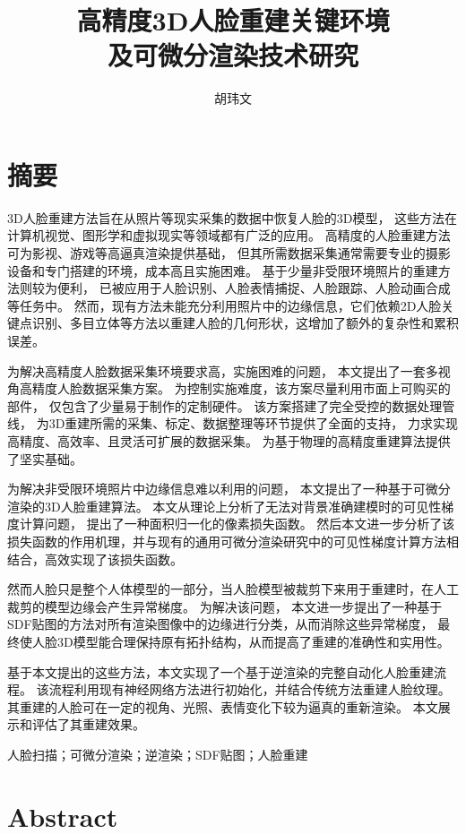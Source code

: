 \documentclass{scutmaster}
\title{高精度3D人脸重建关键环境\texorpdfstring{\\}{}及可微分渲染技术研究}
\date{\zhtoday}
\author{胡玮文}
\begin{document}
\maketitle
\hideinblind{
    \maketitleEN
    \nominationpage
    \declareoforiginality
}

\frontmatter
\chapter{摘\texorpdfstring{\quad}{}要}

3D人脸重建方法旨在从照片等现实采集的数据中恢复人脸的3D模型，
这些方法在计算机视觉、图形学和虚拟现实等领域都有广泛的应用。
高精度的人脸重建方法可为影视、游戏等高逼真渲染提供基础，
但其所需数据采集通常需要专业的摄影设备和专门搭建的环境，成本高且实施困难。
基于少量非受限环境照片的重建方法则较为便利，
已被应用于人脸识别、人脸表情捕捉、人脸跟踪、人脸动画合成等任务中。
然而，现有方法未能充分利用照片中的边缘信息，它们依赖2D人脸关键点识别、多目立体等方法以重建人脸的几何形状，这增加了额外的复杂性和累积误差。

为解决高精度人脸数据采集环境要求高，实施困难的问题，
本文提出了一套多视角高精度人脸数据采集方案。
为控制实施难度，该方案尽量利用市面上可购买的部件，
仅包含了少量易于制作的定制硬件。
该方案搭建了完全受控的数据处理管线，
为3D重建所需的采集、标定、数据整理等环节提供了全面的支持，
力求实现高精度、高效率、且灵活可扩展的数据采集。
为基于物理的高精度重建算法提供了坚实基础。

为解决非受限环境照片中边缘信息难以利用的问题，
本文提出了一种基于可微分渲染的3D人脸重建算法。
本文从理论上分析了无法对背景准确建模时的可见性梯度计算问题，
提出了一种面积归一化的像素损失函数。
然后本文进一步分析了该损失函数的作用机理，并与现有的通用可微分渲染研究中的可见性梯度计算方法相结合，高效实现了该损失函数。

然而人脸只是整个人体模型的一部分，当人脸模型被裁剪下来用于重建时，在人工裁剪的模型边缘会产生异常梯度。
为解决该问题，
本文进一步提出了一种基于SDF贴图的方法对所有渲染图像中的边缘进行分类，从而消除这些异常梯度，
最终使人脸3D模型能合理保持原有拓扑结构，从而提高了重建的准确性和实用性。

基于本文提出的这些方法，本文实现了一个基于逆渲染的完整自动化人脸重建流程。
该流程利用现有神经网络方法进行初始化，并结合传统方法重建人脸纹理。
其重建的人脸可在一定的视角、光照、表情变化下较为逼真的重新渲染。
本文展示和评估了其重建效果。

 人脸扫描；可微分渲染；逆渲染；SDF贴图；人脸重建

\chapter{Abstract}
\end{document}
